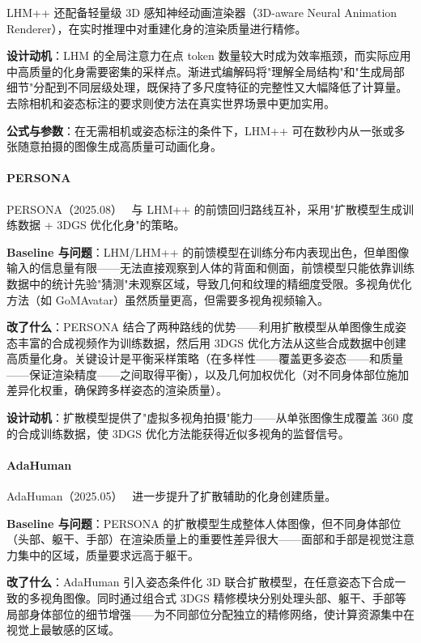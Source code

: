 LHM++ 还配备轻量级 3D 感知神经动画渲染器（3D-aware Neural Animation Renderer），在实时推理中对重建化身的渲染质量进行精修。

\textbf{设计动机}：LHM 的全局注意力在点 token 数量较大时成为效率瓶颈，而实际应用中高质量的化身需要密集的采样点。渐进式编解码将"理解全局结构"和"生成局部细节"分配到不同层级处理，既保持了多尺度特征的完整性又大幅降低了计算量。去除相机和姿态标注的要求则使方法在真实世界场景中更加实用。

\textbf{公式与参数}：在无需相机或姿态标注的条件下，LHM++ 可在数秒内从一张或多张随意拍摄的图像生成高质量可动画化身。

\paragraph{PERSONA}

PERSONA（2025.08）~\cite{2508_09973} 与 LHM++ 的前馈回归路线互补，采用"扩散模型生成训练数据 + 3DGS 优化化身"的策略。

\textbf{Baseline 与问题}：LHM/LHM++ 的前馈模型在训练分布内表现出色，但单图像输入的信息量有限——无法直接观察到人体的背面和侧面，前馈模型只能依靠训练数据中的统计先验"猜测"未观察区域，导致几何和纹理的精细度受限。多视角优化方法（如 GoMAvatar）虽然质量更高，但需要多视角视频输入。

\textbf{改了什么}：PERSONA 结合了两种路线的优势——利用扩散模型从单图像生成姿态丰富的合成视频作为训练数据，然后用 3DGS 优化方法从这些合成数据中创建高质量化身。关键设计是平衡采样策略（在多样性——覆盖更多姿态——和质量——保证渲染精度——之间取得平衡），以及几何加权优化（对不同身体部位施加差异化权重，确保跨多样姿态的渲染质量）。

\textbf{设计动机}：扩散模型提供了"虚拟多视角拍摄"能力——从单张图像生成覆盖 360 度的合成训练数据，使 3DGS 优化方法能获得近似多视角的监督信号。

\paragraph{AdaHuman}

AdaHuman（2025.05）~\cite{2505_24877} 进一步提升了扩散辅助的化身创建质量。

\textbf{Baseline 与问题}：PERSONA 的扩散模型生成整体人体图像，但不同身体部位（头部、躯干、手部）在渲染质量上的重要性差异很大——面部和手部是视觉注意力集中的区域，质量要求远高于躯干。

\textbf{改了什么}：AdaHuman 引入姿态条件化 3D 联合扩散模型，在任意姿态下合成一致的多视角图像。同时通过组合式 3DGS 精修模块分别处理头部、躯干、手部等局部身体部位的细节增强——为不同部位分配独立的精修网络，使计算资源集中在视觉上最敏感的区域。

